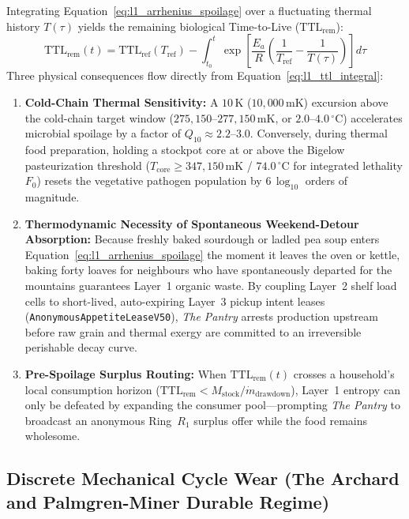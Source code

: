 Integrating Equation~\eqref{eq:l1_arrhenius_spoilage} over a fluctuating thermal history $T(\tau)$ yields the remaining biological Time-to-Live ($\mathrm{TTL}_{\mathrm{rem}}$):
\begin{equation}
\mathrm{TTL}_{\mathrm{rem}}(t) = \mathrm{TTL}_{\mathrm{ref}}(T_{\mathrm{ref}}) - \int_{t_0}^{t} \exp\left[ \frac{E_a}{R} \left( \frac{1}{T_{\mathrm{ref}}} - \frac{1}{T(\tau)} \right) \right] d\tau
\label{eq:l1_ttl_integral}
\end{equation}
Three physical consequences flow directly from Equation~\eqref{eq:l1_ttl_integral}:
\begin{enumerate}
    \item \textbf{Cold-Chain Thermal Sensitivity:} A $10\,\mathrm{K}$ ($10{,}000\,\mathrm{mK}$) excursion above the cold-chain target window ($275{,}150\text{--}277{,}150\,\mathrm{mK}$, or $2.0\text{--}4.0\,^\circ\mathrm{C}$) accelerates microbial spoilage by a factor of $Q_{10} \approx 2.2\text{--}3.0$. Conversely, during thermal food preparation, holding a stockpot core at or above the Bigelow pasteurization threshold ($T_{\mathrm{core}} \ge 347{,}150\,\mathrm{mK}$ / $74.0\,^\circ\mathrm{C}$ for integrated lethality $F_0$) resets the vegetative pathogen population by $6\,\log_{10}$ orders of magnitude.
    \item \textbf{Thermodynamic Necessity of Spontaneous Weekend-Detour Absorption:} Because freshly baked sourdough or ladled pea soup enters Equation~\eqref{eq:l1_arrhenius_spoilage} the moment it leaves the oven or kettle, baking forty loaves for neighbours who have spontaneously departed for the mountains guarantees Layer~1 organic waste. By coupling Layer~2 shelf load cells to short-lived, auto-expiring Layer~3 pickup intent leases (\texttt{AnonymousAppetiteLeaseV50}), \textit{The Pantry} arrests production upstream before raw grain and thermal exergy are committed to an irreversible perishable decay curve.
    \item \textbf{Pre-Spoilage Surplus Routing:} When $\mathrm{TTL}_{\mathrm{rem}}(t)$ crosses a household's local consumption horizon ($\mathrm{TTL}_{\mathrm{rem}} < M_{\mathrm{stock}} / \dot{m}_{\mathrm{drawdown}}$), Layer~1 entropy can only be defeated by expanding the consumer pool---prompting \textit{The Pantry} to broadcast an anonymous Ring~$R_1$ surplus offer while the food remains wholesome.
\end{enumerate}

\subsection{Discrete Mechanical Cycle Wear (The Archard and Palmgren-Miner Durable Regime)}

